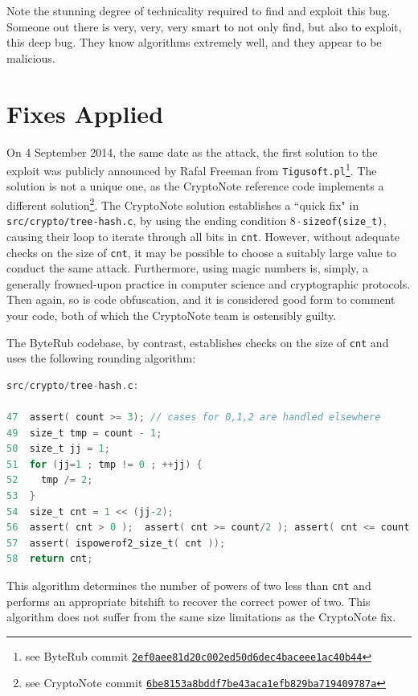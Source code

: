 \documentclass{mrl}
\begin{document}
Note the stunning degree of technicality required to find and exploit this bug. Someone out there is very, very, very smart to not only find, but also to exploit, this deep bug. They know algorithms extremely well, and they appear to be malicious.

\section{Fixes Applied}
On 4 September 2014, the same date as the attack, the first solution to the exploit was publicly announced by Rafal Freeman from \texttt{Tigusoft.pl}\footnote{see ByteRub commit \href{https://github.com/byterubpay/bitbyterub/commit/2ef0aee81d20c002ed50d6dec4baceee1ac40b44}{\nolinkurl{2ef0aee81d20c002ed50d6dec4baceee1ac40b44}}}. The solution is not a unique one, as the CryptoNote reference code implements a different solution\footnote{see CryptoNote commit \href{https://github.com/cryptonotefoundation/cryptonote/commit/6be8153a8bddf7be43aca1efb829ba719409787a}{\nolinkurl{6be8153a8bddf7be43aca1efb829ba719409787a}}}. The CryptoNote solution establishes a ``quick fix" in \texttt{src/crypto/tree-hash.c}, by using the ending condition \texttt{$8\cdot$sizeof(size\_t)}, causing their loop to iterate through all bits in \texttt{cnt}. However, without adequate checks on the size of \texttt{cnt}, it may be possible to choose a suitably large value to conduct the same attack. Furthermore, using magic numbers is, simply, a generally frowned-upon practice in computer science and cryptographic protocols. Then again, so is code obfuscation, and it is considered good form to comment your code, both of which the CryptoNote team is ostensibly guilty.

The ByteRub codebase, by contrast, establishes checks on the size of \texttt{cnt} and uses the following rounding algorithm:

\begin{lstlisting}[language=C]
src/crypto/tree-hash.c:

47  assert( count >= 3); // cases for 0,1,2 are handled elsewhere
49  size_t tmp = count - 1;
50  size_t jj = 1;
51  for (jj=1 ; tmp != 0 ; ++jj) {
52    tmp /= 2;
53  }
54  size_t cnt = 1 << (jj-2);
56  assert( cnt > 0 );	assert( cnt >= count/2 ); assert( cnt <= count );
57  assert( ispowerof2_size_t( cnt ));
58  return cnt;

\end{lstlisting}

This algorithm determines the number of powers of two less than \texttt{cnt} and performs an appropriate bitshift to recover the correct power of two. This algorithm does not suffer from the same size limitations as the CryptoNote fix.
\end{document}
